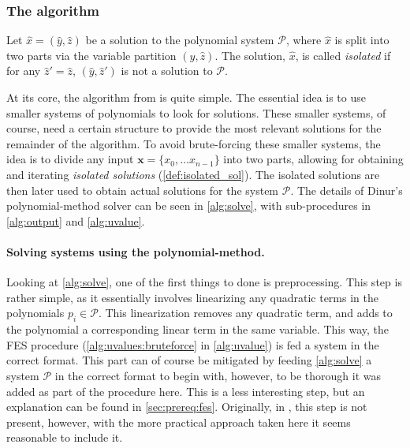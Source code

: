 \subsubsection{The algorithm} \label{sec:prereq:dinur_alg}
\begin{defn} \label{def:isolated_sol}
    Let $\hat{x} = (\hat{y}, \hat{z})$ be a solution to the polynomial system $\mathcal{P}$, where $\hat{x}$ is split into two parts via the variable partition $(\hat{y}, \hat{z})$. The solution, $\hat{x}$, is called \textit{isolated} if for any $\hat{z}' = \hat{z}$, $(\hat{y}, \hat{z}')$ is not a solution to $\mathcal{P}$.
\end{defn}

At its core, the algorithm from \cite{cryptoeprint:2021/578} is quite simple. The essential idea is to use smaller systems of polynomials to look for solutions. These smaller systems, of course, need a certain structure to provide the most relevant solutions for the remainder of the algorithm. To avoid brute-forcing these smaller systems, the idea is to divide any input $\mathbf{x} = \{x_0, \dots x_{n - 1}\}$ into two parts, allowing for obtaining and iterating \textit{isolated solutions} (\cref{def:isolated_sol}). The isolated solutions are then later used to obtain actual solutions for the system $\mathcal{P}$. The details of Dinur's polynomial-method solver can be seen in \cref{alg:solve}, with sub-procedures in \cref{alg:output} and \cref{alg:uvalue}.

\paragraph{Solving systems using the polynomial-method.} Looking at \cref{alg:solve}, one of the first things to done is preprocessing. This step is rather simple, as it essentially involves linearizing any quadratic terms in the polynomials $p_i \in \mathcal{P}$. This linearization removes any quadratic term, and adds to the polynomial a corresponding linear term in the same variable. This way, the FES procedure (\cref{alg:uvalues:bruteforce} in \cref{alg:uvalue}) is fed a system in the correct format. This part can of course be mitigated by feeding \cref{alg:solve} a system $\mathcal{P}$ in the correct format to begin with, however, to be thorough it was added as part of the procedure here. This is a less interesting step, but an explanation can be found in \cref{sec:prereq:fes}. Originally, in \cite{cryptoeprint:2021/578}, this step is not present, however, with the more practical approach taken here it seems reasonable to include it.

